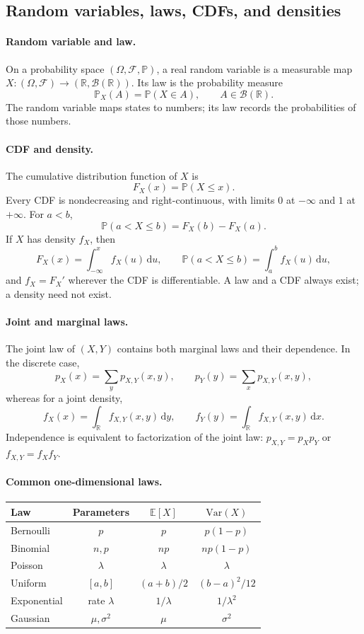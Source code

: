\documentclass[11pt]{article}
\newcommand{\R}{\mathbb{R}}
\newcommand{\F}{\mathcal{F}}
\newcommand{\Pbb}{\mathbb{P}}
\newcommand{\E}{\mathbb{E}}
\newcommand{\Var}{\mathrm{Var}}
\newcommand{\dd}{\,\mathrm{d}}
\newcommand{\1}{\mathbf{1}}
\theoremstyle{plain}
\theoremstyle{definition}
\theoremstyle{remark}
\begin{document}
\subsection{Random variables, laws, CDFs, and densities}

\paragraph{Random variable and law.}
On a probability space $(\Omega,\F,\Pbb)$, a real random variable is a
measurable map $X:(\Omega,\F)\to(\R,\mathcal B(\R))$. Its law is the
probability measure
\[
\Pbb_X(A)=\Pbb(X\in A),
\qquad A\in\mathcal B(\R).
\]
The random variable maps states to numbers; its law records the probabilities
of those numbers.

\paragraph{CDF and density.}
The cumulative distribution function of $X$ is
\[
F_X(x)=\Pbb(X\le x).
\]
Every CDF is nondecreasing and right-continuous, with limits $0$ at
$-\infty$ and $1$ at $+\infty$. For $a<b$,
\[
\Pbb(a<X\le b)=F_X(b)-F_X(a).
\]
If $X$ has density $f_X$, then
\[
F_X(x)=\int_{-\infty}^x f_X(u)\dd u,
\qquad
\Pbb(a<X\le b)=\int_a^b f_X(u)\dd u,
\]
and $f_X=F_X'$ wherever the CDF is differentiable. A law and a CDF always
exist; a density need not exist.

\paragraph{Joint and marginal laws.}
The joint law of $(X,Y)$ contains both marginal laws and their dependence.
In the discrete case,
\[
p_X(x)=\sum_y p_{X,Y}(x,y),
\qquad
p_Y(y)=\sum_x p_{X,Y}(x,y),
\]
whereas for a joint density,
\[
f_X(x)=\int_{\R}f_{X,Y}(x,y)\dd y,
\qquad
f_Y(y)=\int_{\R}f_{X,Y}(x,y)\dd x.
\]
Independence is equivalent to factorization of the joint law:
$p_{X,Y}=p_Xp_Y$ or $f_{X,Y}=f_Xf_Y$.

\paragraph{Common one-dimensional laws.}
\begin{center}
\renewcommand{\arraystretch}{1.15}
\begin{tabular}{@{}lccc@{}}
\toprule
Law & Parameters & $\E[X]$ & $\Var(X)$\\
\midrule
Bernoulli & $p$ & $p$ & $p(1-p)$\\
Binomial & $n,p$ & $np$ & $np(1-p)$\\
Poisson & $\lambda$ & $\lambda$ & $\lambda$\\
Uniform & $[a,b]$ & $(a+b)/2$ & $(b-a)^2/12$\\
Exponential & rate $\lambda$ & $1/\lambda$ & $1/\lambda^2$\\
Gaussian & $\mu,\sigma^2$ & $\mu$ & $\sigma^2$\\
\bottomrule
\end{tabular}
\end{center}
\end{document}
